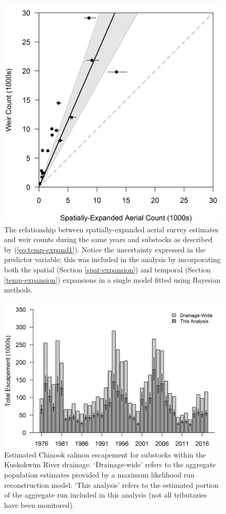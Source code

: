 \documentclass[12pt,]{book}
\theoremstyle{definition}
\theoremstyle{definition}
\theoremstyle{definition}
\theoremstyle{remark}
\begin{document}
\begin{figure}
  \centering
  \includegraphics{img/Ch4/obs-correct.png}
  \caption{The relationship between spatially-expanded aerial survey estimates and weir counts during the same years and substocks as described by (\ref{eq:temp-expand1}). Notice the uncertainty expressed in the predictor variable; this was included in the analysis by incorporating both the spatial (Section \ref{spat-expansion}) and temporal (Section \ref{temp-expansion}) expansions in a single model fitted using Bayesian methods.}
  \label{fig:obs-correct}
\end{figure}

\clearpage

\begin{figure}
  \centering
  \includegraphics{img/Ch4/obs-fraction.png}
  \caption{Estimated Chinook salmon escapement for substocks within the Kuskokwim River drainage. `Drainage-wide' refers to the aggregate population estimates provided by a maximum likelihood run reconstruction model. `This analysis' refers to the estimated portion of the aggregate run included in this analysis (not all tributaries have been monitored).}
  \label{fig:obs-fraction}
\end{figure}
\end{document}
